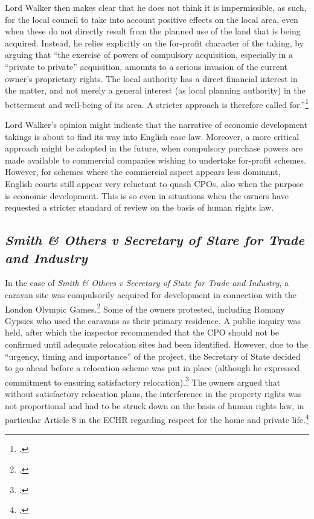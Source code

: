 Lord Walker then makes clear that he does not think it is impermissible, as such, for the local council to take into account positive effects on the local area, even when these do not directly result from the planned use of the land that is being acquired. Instead, he relies explicitly on the for-profit character of the taking, by arguing that ``the exercise of powers of compulsory acquisition, especially in a ``private to private'' acquisition, amounts to a serious invasion of the current owner's proprietary rights. The local authority has a direct financial interest in the matter, and not merely a general interest (as local planning authority) in the betterment and well-being of its area. A stricter approach is therefore called for.''\footcite[84]{sainsbury10} 

Lord Walker's opinion might indicate that the narrative of economic development takings is about to find its way into English case law. Moreover, a more critical approach might be adopted in the future, when compulsory purchase powers are made available to commercial companies wishing to undertake for-profit schemes. However, for schemes where the commercial aspect appears less dominant, English courts still appear very reluctant to quash CPOs, also when the purpose is economic development. This is so even in situations when the owners have requested a stricter standard of review on the basis of human rights law. 

\subsection{{\it Smith \& Others v Secretary of Stare for Trade and Industry}}

In the case of {\it Smith \& Others v Secretary of State for Trade and Industry}, a caravan site was compulsorily acquired for development in connection with the London Olympic Games.\footcite{smith08} Some of the owners protested, including Romany Gypsies who used the caravans as their primary residence. A public inquiry was held, after which the inspector recommended that the CPO should not be confirmed until adequate relocation sites had been identified. However, due to the ``urgency, timing and importance'' of the project, the Secretary of State decided to go ahead before a relocation scheme was put in place (although he expressed commitment to ensuring satisfactory relocation).\footcite[10]{smith08} The owners argued that without satisfactory relocation plans, the interference in the property rights was not proportional and had to be struck down on the basis of human rights law, in particular Article 8 in the ECHR regarding respect for the home and private life.\footcite[27-51]{smith08}

